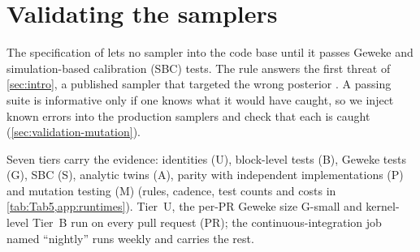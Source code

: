 \section{Validating the samplers}\label{sec:validation}\label{sec:validation-principle}

The specification of  lets no sampler into the code base until it passes Geweke and
simulation-based calibration (SBC) tests. %
The rule answers the first threat of \cref{sec:intro}, a published sampler that targeted the
wrong posterior \citep{carriero2019large,bognanni2022comment,carriero2022corrigendum}. %
A passing suite is informative only if one knows what it would
have caught, so we inject known errors into the production samplers and check that each is caught
(\cref{sec:validation-mutation}). %

\label{sec:validation-tiers}\label{sec:validation-cost}%
Seven tiers carry the evidence: identities (U), block-level tests (B), Geweke tests (G), SBC (S),
analytic twins (A), parity with independent implementations (P) and mutation testing (M) (rules,
cadence, test counts and costs in \cref{tab:Tab5,app:runtimes}).
Tier~U, the per-PR Geweke size G-small and kernel-level Tier~B run on every pull request (PR);
the continuous-integration job named ``nightly'' runs weekly and carries the rest. %

